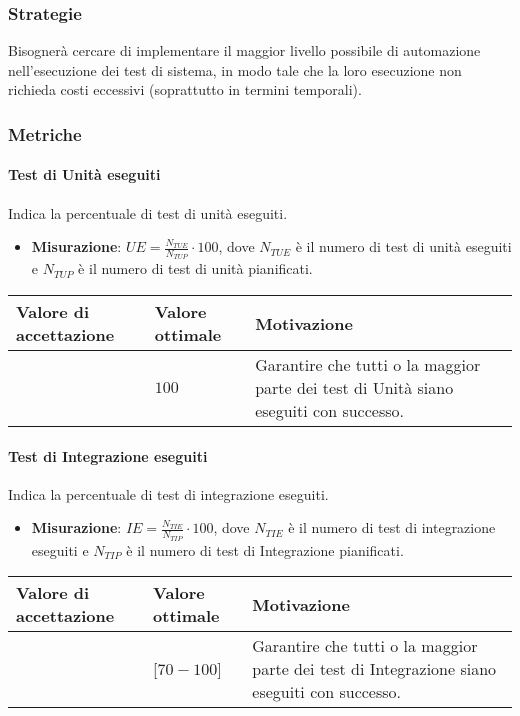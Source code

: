 \subsubsection{Strategie}
Bisognerà cercare di implementare il maggior livello possibile di automazione nell'esecuzione dei test di sistema, in modo tale che la loro esecuzione non richieda costi eccessivi (soprattutto in termini temporali).

\subsubsection{Metriche}

\paragraph{Test di Unità eseguiti}
Indica la percentuale di test di unità eseguiti.
\begin{itemize}
\item \textbf{Misurazione}: $UE=\frac{N_{TUE}}{N_{TUP}} \cdot 100$, dove $N_{TUE}$ è il numero di test di unità eseguiti e $N_{TUP}$ è il numero di test di unità pianificati.
\end{itemize}

\begin{center}
		\begin{tabular}{|P{2.5cm}|P{2.5cm}|P{6cm}|}
		\hline
			\textbf{Valore di accettazione}	& \textbf{Valore ottimale} & \textbf{Motivazione} \\
			\hline
			[$90 - 100$] & $100$ &	Garantire che tutti o la maggior parte dei test di Unità siano eseguiti con successo. \\
			\hline
			\end{tabular}
\end{center}


\paragraph{Test di Integrazione eseguiti}
Indica la percentuale di test di integrazione eseguiti.
\begin{itemize}
\item \textbf{Misurazione}: $IE=\frac{N_{TIE}}{N_{TIP}} \cdot 100$, dove $N_{TIE}$ è il numero di test di integrazione eseguiti e $N_{TIP}$ è il numero di test di Integrazione pianificati.
\end{itemize}

\begin{center}
		\begin{tabular}{|P{2.5cm}|P{2.5cm}|P{6cm}|}
		\hline
			\textbf{Valore di accettazione}	& \textbf{Valore ottimale} & \textbf{Motivazione} \\
			\hline
			[$60 - 100$] & [$70 - 100$] &	Garantire che tutti o la maggior parte dei test di Integrazione siano eseguiti con successo. \\
			\hline
			\end{tabular}
\end{center}


